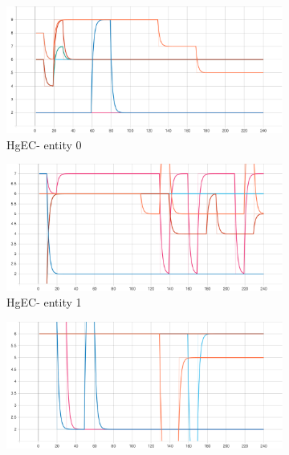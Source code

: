 \begin{figure}[htbp]
    \begin{subfigure}{0.5\textwidth}
        \centering
        \includegraphics[width=\textwidth]{analysis/bhh_case_study/iris/HgEC[0].png}
        \caption{HgEC\rbrack - entity 0}
        \label{fig:results:case_study:iris:HgEC:0}
    \end{subfigure}
    \begin{subfigure}{0.5\textwidth}
        \centering
        \includegraphics[width=\textwidth]{analysis/bhh_case_study/iris/HgEC[1].png}
        \caption{HgEC\rbrack - entity 1}
        \label{fig:results:case_study:iris:HgEC:1}
    \end{subfigure}
    \par\bigskip
    \begin{subfigure}{0.5\textwidth}
        \centering
        \includegraphics[width=\textwidth]{analysis/bhh_case_study/iris/HgEC[2].png}

\end{subfigure}
\end{figure}
